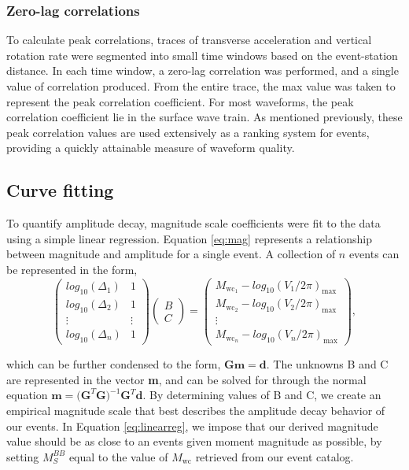 \documentclass{gji}
\begin{document}
\subsubsection{Zero-lag correlations}
To calculate peak correlations, traces of transverse acceleration and vertical rotation rate were segmented into small time windows based on the event-station distance. In each time window, a zero-lag correlation was performed, and a single value of correlation produced. From the entire trace, the max value was taken to represent the peak correlation coefficient. For most waveforms, the peak correlation coefficient lie in the surface wave train. As mentioned previously, these peak correlation values are used extensively as a ranking system for events, providing a quickly attainable measure of waveform quality.

\subsection{Curve fitting}
To quantify amplitude decay, magnitude scale coefficients were fit to the data using a simple linear regression. Equation \ref{eq:mag} represents a relationship between magnitude and amplitude for a single event. A collection of $n$ events can be represented in the form, 
\begin{equation}
	\begin{pmatrix}
		log_{10}(\Delta_{1}) & 1 \\
		log_{10}(\Delta_{2}) & 1 \\
		\vdots  & \vdots \\
		log_{10}(\Delta_{n}) & 1 
	\end{pmatrix}
	\begin{pmatrix}
		{B}\\
		{C}
	\end{pmatrix}
	=
	\begin{pmatrix}
		M_{\text{wc}_1} - log_{10}({V_1}/{2\pi})_{\text{max}} \\
		M_{\text{wc}_2} - log_{10}({V_2}/{2\pi})_{\text{max}} \\
		\vdots  \\
		M_{\text{wc}_n} - log_{10}({V_n}/{2\pi})_{\text{max}}
	\end{pmatrix},
	\label{eq:linearreg}
\end{equation}

\noindent which can be further condensed to the form, $\mathbf{Gm = d}$. The unknowns B and C are represented in the vector {\bfseries m}, and can be solved for through the normal equation $\mathbf{m} = \mathbf{(G}^{T}\mathbf{G})^{-1}\mathbf{G}^T\mathbf{d}$.
By determining values of B and C, we create an empirical magnitude scale that best describes the amplitude decay behavior of our events. In Equation \ref{eq:linearreg}, we impose that our derived magnitude value should be as close to an events given moment magnitude as possible, by setting $M_S^{BB}$ equal to the value of $M_\text{wc}$ retrieved from our event catalog. 
\end{document}
